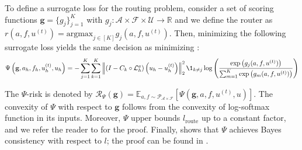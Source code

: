 \documentclass{article} %
\begin{document}
To define a surrogate loss for the routing problem, consider a set of scoring functions $\mathbf{g} =\{g_j\}_{j = 1}^K$ with $g_j: \mathcal{A} \times \mathcal{F} \times \mathcal{U} \to \mathbb{R}$ and we define the router as $r(a, f, u^{(t)}) = \text{argmax}_{j \in [K]} g_j(a, f, u^{(t)})$. Then, minimizing the following surrogate loss yields the same decision as minimizing :
\begin{equation} \label{eq:routersurrogate}
    \Psi\left(\mathbf{g}, a_h, f_h, u^{(t)}_h, u_h\right) = -\sum_{j = 1}^K \sum_{k = 1}^K\left\|\left( I - C_{k} \circ \mathcal{L}_{h}^a\right)\left(u_h - u^{(t)}_h\right)\right\|^2_2\1_{k\neq j}\log\left(\frac{\exp\left(g_j(a, f, u^{(t)})\right)}{\sum_{m = 1}^K\exp\left(g_m(a, f, u^{(t)})\right)}\right)
\end{equation}

The $\Psi$-risk is denoted by $\mathcal{R}_{\Psi}\left(\mathbf{g}\right) = \mathbb{E}_{a, f \sim \mathcal{P}_{\mathcal{A} \times \mathcal{F}}}\left[\Psi\left(\mathbf{g}, a, f, u^{(t)}, u\right)\right]$. The convexity of $\Psi$ with respect to $\mathbf{g}$ follows from the convexity of log-softmax function in its inputs. Moreover, $\Psi$ upper bounds $l_{\text{route}}$ up to a constant factor, and we refer the reader to  for the proof. Finally,  shows that $\Psi$ achieves Bayes consistency with respect to $l$; the proof can be found in .
\end{document}
